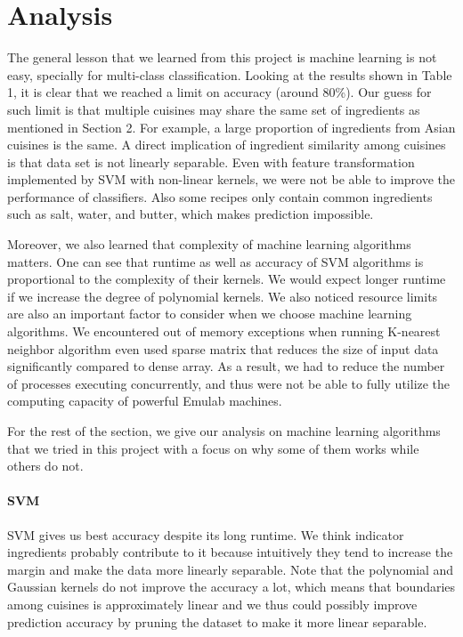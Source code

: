 \section{Analysis}
The general lesson that we learned from this project is machine
learning is not easy, specially for multi-class
classification. Looking at the results shown in Table 1, it is clear
that we reached a limit on accuracy (around 80\%). Our guess for such
limit is that multiple cuisines may share the same set of ingredients
as mentioned in Section 2. For example, a large proportion of
ingredients from Asian cuisines is the same. A direct implication of
ingredient similarity among cuisines is that data set is not linearly
separable. Even with feature transformation implemented by SVM with
non-linear kernels, we were not be able to improve the performance of
classifiers. Also some recipes only contain common ingredients such as
salt, water, and butter, which makes prediction impossible. 

Moreover, we also learned that complexity of machine learning
algorithms matters. One can see that runtime as well as accuracy of
SVM algorithms is proportional to the complexity of their kernels. We
would expect longer runtime if we increase the degree of polynomial
kernels. %
We also noticed resource
limits are also an important factor to consider when we choose machine
learning algorithms. We encountered out of memory exceptions when
running K-nearest neighbor algorithm even used sparse matrix that
reduces the size of input data significantly compared to dense
array. As a result, we had to reduce the number of processes executing
concurrently, and thus were not be able to fully utilize the computing
capacity of powerful Emulab machines. 

For the rest of the section, we give our analysis on machine learning
algorithms that we tried in this project with a focus on why some of
them works while others do not. 

\paragraph{SVM} SVM gives us best accuracy despite its long
runtime. We think indicator ingredients probably contribute to it
because intuitively they tend to increase the margin and make the data
more linearly separable. Note that the polynomial and Gaussian kernels
do not improve the accuracy a lot, which means that boundaries among 
cuisines is approximately linear and we thus could possibly improve prediction
accuracy by pruning the dataset to make it more linear separable. %

